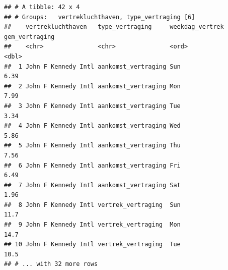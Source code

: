 \documentclass[]{tufte-book}
\newenvironment{Shaded}{}{}
\newcommand{\DataTypeTok}[1]{\textcolor[rgb]{0.56,0.13,0.00}{#1}}
\newcommand{\DecValTok}[1]{\textcolor[rgb]{0.25,0.63,0.44}{#1}}
\newcommand{\KeywordTok}[1]{\textcolor[rgb]{0.00,0.44,0.13}{\textbf{#1}}}
\newcommand{\NormalTok}[1]{#1}
\newcommand{\OperatorTok}[1]{\textcolor[rgb]{0.40,0.40,0.40}{#1}}
\newcommand{\StringTok}[1]{\textcolor[rgb]{0.25,0.44,0.63}{#1}}
\begin{document}
\begin{Shaded}
\end{Shaded}

\begin{verbatim}
## # A tibble: 42 x 4
## # Groups:   vertrekluchthaven, type_vertraging [6]
##    vertrekluchthaven   type_vertraging     weekdag_vertrek gem_vertraging
##    <chr>               <chr>               <ord>                    <dbl>
##  1 John F Kennedy Intl aankomst_vertraging Sun                       6.39
##  2 John F Kennedy Intl aankomst_vertraging Mon                       7.99
##  3 John F Kennedy Intl aankomst_vertraging Tue                       3.34
##  4 John F Kennedy Intl aankomst_vertraging Wed                       5.86
##  5 John F Kennedy Intl aankomst_vertraging Thu                       7.56
##  6 John F Kennedy Intl aankomst_vertraging Fri                       6.49
##  7 John F Kennedy Intl aankomst_vertraging Sat                       1.96
##  8 John F Kennedy Intl vertrek_vertraging  Sun                      11.7 
##  9 John F Kennedy Intl vertrek_vertraging  Mon                      14.7 
## 10 John F Kennedy Intl vertrek_vertraging  Tue                      10.5 
## # ... with 32 more rows
\end{verbatim}

\begin{Shaded}
\end{Shaded}
\end{document}
